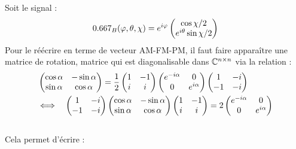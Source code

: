 Soit le signal :
\[\x_B(\varphi, \theta, \chi) = e^{i\varphi} \begin{pmatrix}
	\cos \chi/2 \\ e^{i\theta}\sin\chi/2\end{pmatrix}\]
Pour le réécrire en terme de vecteur AM-FM-PM, il faut faire apparaître une matrice de rotation, matrice qui est diagonalisable dans $\mathbb{C}^{n\times n}$ via la relation :
\begin{align*}
	&\begin{pmatrix} 
		\cos \alpha & -\sin \alpha \\ 
		\sin\alpha & \cos\alpha 
	\end{pmatrix} = \frac{1}{2} \begin{pmatrix} 
		1 & -1 \\ i & i
	\end{pmatrix}\begin{pmatrix} 
		e^{-i\alpha} & 0 \\ 
		0 & e^{i\alpha} 
	\end{pmatrix}\begin{pmatrix} 
		1 & -i \\ -1 & -i
	\end{pmatrix}\\
	&\Longleftrightarrow\quad \begin{pmatrix} 
		1 & -i \\ -1 & -i
	\end{pmatrix}\begin{pmatrix} 
		\cos \alpha & -\sin \alpha \\ 
		\sin\alpha & \cos\alpha 
	\end{pmatrix} \begin{pmatrix} 
		1 & -1 \\ i & i
	\end{pmatrix} = 2 \begin{pmatrix} 
		e^{-i\alpha} & 0 \\ 
		0 & e^{i\alpha} 
	\end{pmatrix}
\end{align*}
\\
Cela permet d'écrire :
